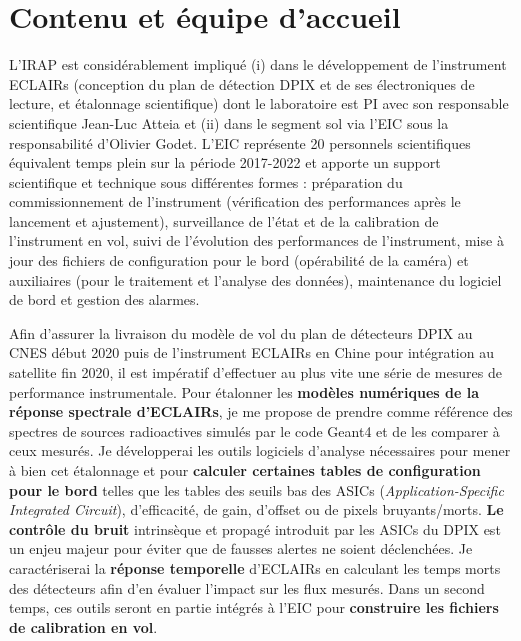 \documentclass[11pt,onecolumn]{article}
\begin{document}
\section{Contenu et équipe d'accueil}

L'IRAP est considérablement impliqué (i) dans le développement de l'instrument ECLAIRs (conception du plan de détection DPIX et de ses électroniques de lecture, et étalonnage scientifique) dont le laboratoire est PI avec son responsable scientifique Jean-Luc Atteia et (ii) dans le segment sol via l'EIC sous la responsabilité d'Olivier Godet. L'EIC représente 20 personnels scientifiques équivalent temps plein sur la période 2017-2022 et apporte un support scientifique et technique sous différentes formes : préparation du commissionnement de l'instrument (vérification des performances après le lancement et ajustement), surveillance de l'état et de la calibration de l'instrument en vol, suivi de l'évolution des performances de l'instrument, mise à jour des fichiers de configuration pour le bord (opérabilité de la caméra) et auxiliaires (pour le traitement et l'analyse des données), maintenance du logiciel de bord et gestion des alarmes.

Afin d'assurer la livraison du modèle de vol du plan de détecteurs DPIX au CNES début 2020 puis de l'instrument ECLAIRs en Chine pour intégration au satellite fin 2020, il est impératif d'effectuer au plus vite une série de mesures de performance instrumentale. Pour étalonner les \textbf{modèles numériques de la réponse spectrale d'ECLAIRs}, je me propose de prendre comme référence des spectres de sources radioactives simulés par le code Geant4 et de les comparer à ceux mesurés. Je développerai les outils logiciels d'analyse nécessaires pour mener à bien cet étalonnage et pour \textbf{calculer certaines tables de configuration pour le bord} telles que les tables des seuils bas des ASICs (\textit{Application-Specific Integrated Circuit}), d'efficacité, de gain, d'offset ou de pixels bruyants/morts. \textbf{Le contrôle du bruit} intrinsèque et propagé introduit par les ASICs du DPIX est un enjeu majeur pour éviter que de fausses alertes ne soient déclenchées. Je caractériserai la \textbf{réponse temporelle} d'ECLAIRs en calculant les temps morts des détecteurs afin d'en évaluer l'impact sur les flux mesurés. Dans un second temps, ces outils seront en partie intégrés à l'EIC pour \textbf{construire les fichiers de calibration en vol}.

%
\end{document}
